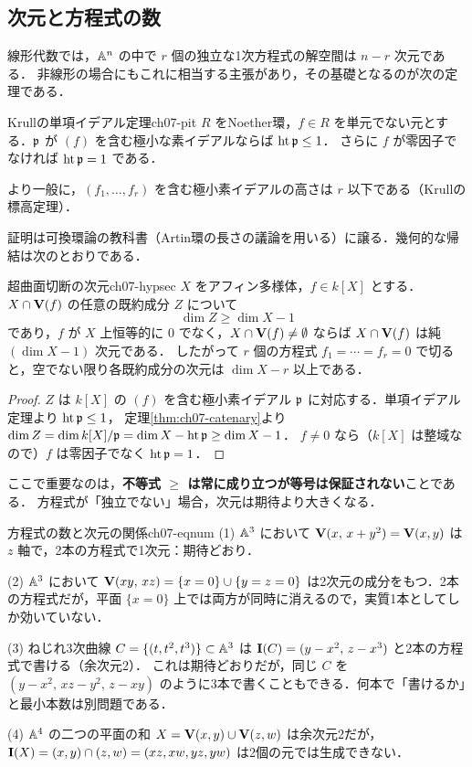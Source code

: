 \subsection{次元と方程式の数}

線形代数では，$\mathbb{A}^n$ の中で $r$ 個の独立な1次方程式の解空間は $n-r$ 次元である．
非線形の場合にもこれに相当する主張があり，その基礎となるのが次の定理である．

\begin{mythm}{Krullの単項イデアル定理}{ch07-pit}
$R$ をNoether環，$f\in R$ を単元でない元とする．$\mathfrak{p}$ が $(f)$ を含む極小な素イデアルならば $\operatorname{ht}\mathfrak{p}\le1$．
さらに $f$ が零因子でなければ $\operatorname{ht}\mathfrak{p}=1$ である．

より一般に，$(f_1,\dots,f_r)$ を含む極小素イデアルの高さは $r$ 以下である（Krullの標高定理）．
\end{mythm}

証明は可換環論の教科書（Artin環の長さの議論を用いる）に譲る．幾何的な帰結は次のとおりである．

\begin{mycor}{超曲面切断の次元}{ch07-hypsec}
$X$ をアフィン多様体，$f\in k[X]$ とする．$X\cap\mathbf{V}(f)$ の任意の既約成分 $Z$ について
\[
  \dim Z\ge\dim X-1
\]
であり，$f$ が $X$ 上恒等的に $0$ でなく，$X\cap\mathbf{V}(f)\ne\emptyset$ ならば $X\cap\mathbf{V}(f)$ は純 $(\dim X-1)$ 次元である．
したがって $r$ 個の方程式 $f_1=\cdots=f_r=0$ で切ると，空でない限り各既約成分の次元は $\dim X-r$ 以上である．
\end{mycor}

\begin{proof}
$Z$ は $k[X]$ の $(f)$ を含む極小素イデアル $\mathfrak{p}$ に対応する．単項イデアル定理より $\operatorname{ht}\mathfrak{p}\le1$，
定理\ref{thm:ch07-catenary}より $\dim Z=\dim k[X]/\mathfrak{p}=\dim X-\operatorname{ht}\mathfrak{p}\ge\dim X-1$．
$f\neq0$ なら（$k[X]$ は整域なので）$f$ は零因子でなく $\operatorname{ht}\mathfrak{p}=1$．
\end{proof}

ここで重要なのは，\textbf{不等式 $\ge$ は常に成り立つが等号は保証されない}ことである．
方程式が「独立でない」場合，次元は期待より大きくなる．

\begin{myex}{方程式の数と次元の関係}{ch07-eqnum}
(1) $\mathbb{A}^3$ において $\mathbf{V}(x,\,x+y^2)=\mathbf{V}(x,y)$ は $z$ 軸で，2本の方程式で1次元：期待どおり．

(2) $\mathbb{A}^3$ において $\mathbf{V}(xy,\,xz)=\{x=0\}\cup\{y=z=0\}$ は2次元の成分をもつ．2本の方程式だが，平面 $\{x=0\}$ 上では両方が同時に消えるので，実質1本としてしか効いていない．

(3) ねじれ3次曲線 $C=\{(t,t^2,t^3)\}\subset\mathbb{A}^3$ は $\mathbf{I}(C)=(y-x^2,\,z-x^3)$ と2本の方程式で書ける（余次元2）．
これは期待どおりだが，同じ $C$ を $(y-x^2,\,xz-y^2,\,z-xy)$ のように3本で書くこともできる．何本で「書けるか」と最小本数は別問題である．

(4) $\mathbb{A}^4$ の二つの平面の和 $X=\mathbf{V}(x,y)\cup\mathbf{V}(z,w)$ は余次元2だが，$\mathbf{I}(X)=(x,y)\cap(z,w)=(xz,xw,yz,yw)$ は2個の元では生成できない．
\end{myex}

